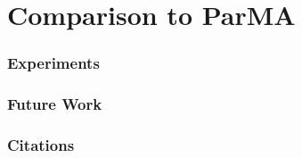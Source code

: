 \documentclass{beamer}
\begin{document}

\section{Comparison to ParMA}

\begin{frame}
  \frametitle{Experiments}
\end{frame}


\begin{frame}
  \frametitle{Future Work}
\end{frame}

\begin{frame}
  \frametitle{Citations}
\end{frame}
  
\end{document}
